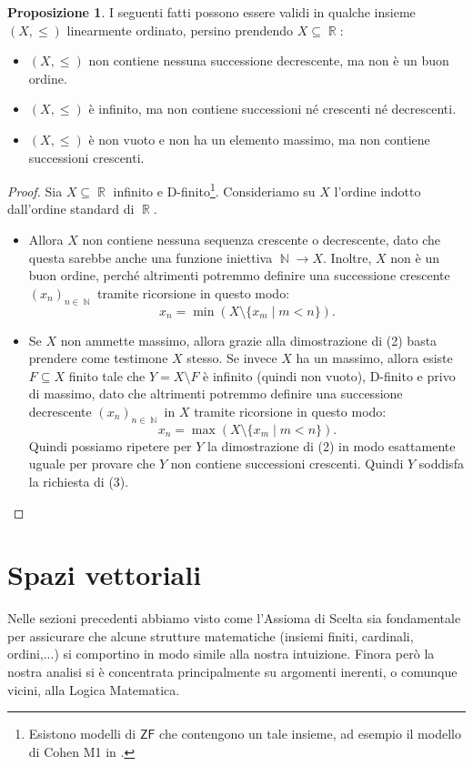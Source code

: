 \documentclass[12pt,a4paper]{report}
\theoremstyle{definition}
\newtheorem{prop}[teo]{Proposizione}  %
\theoremstyle{num.custom-title}
\DeclareMathOperator{\N}{\mathbb{N}}
\DeclareMathOperator{\R}{\mathbb{R}}
\DeclareMathOperator{\sm}{\setminus}
\newcommand{\ZF}{\ensuremath{\mathsf{ZF}}\xspace}
\begin{document}
\begin{prop}
I seguenti fatti possono essere validi in qualche insieme $(X, \leq)$ linearmente ordinato, persino prendendo $X \subseteq \R$:
\begin{itemize}
\item[(1)] $(X, \leq)$ non contiene nessuna successione decrescente, ma non è un buon ordine.
\item[(2)] $(X, \leq)$ è infinito, ma non contiene successioni né crescenti né decrescenti.
\item[(3)] $(X, \leq)$ è non vuoto e non ha un elemento massimo, ma non contiene successioni crescenti.
\end{itemize}
\begin{proof} Sia $X \subseteq \R$ infinito e D-finito\footnote{Esistono modelli di \ZF che contengono un tale insieme, ad esempio il modello di Cohen M1 in \cite{HoRu98:Herrlich}.}. Consideriamo su $X$ l'ordine indotto dall'ordine standard di $\R$.
\begin{itemize}
\item[(1) e (2)] Allora $X$ non contiene nessuna sequenza crescente o decrescente, dato che questa sarebbe anche una funzione iniettiva $\N \to X$. Inoltre, $X$ non è un buon ordine, perché altrimenti potremmo definire una successione crescente $(x_n)_{n \in \N}$ tramite ricorsione in questo modo:
\[
x_n = \min (X \sm \{x_m \mid m<n\}).
\]
\item[(3)] Se $X$ non ammette massimo, allora grazie alla dimostrazione di (2) basta prendere come testimone $X$ stesso. Se invece $X$ ha un massimo, allora esiste $F \subseteq X$ finito tale che $Y=X \sm F$ è infinito (quindi non vuoto), D-finito e privo di massimo, dato che altrimenti potremmo definire una successione decrescente $(x_n)_{n \in \N}$ in $X$ tramite ricorsione in questo modo:
\[
x_n = \max (X \sm \{x_m \mid m<n\}).
\]
Quindi possiamo ripetere per $Y$ la dimostrazione di (2) in modo esattamente uguale per provare che $Y$ non contiene successioni crescenti. Quindi $Y$ soddisfa la richiesta di (3).
\end{itemize}
\end{proof}
\end{prop}


\section{Spazi vettoriali}

Nelle sezioni precedenti abbiamo visto come l'Assioma di Scelta sia fondamentale per assicurare che alcune strutture matematiche (insiemi finiti, cardinali, ordini,...) si comportino in modo simile alla nostra intuizione. Finora però la nostra analisi si è concentrata principalmente su argomenti inerenti, o comunque vicini, alla Logica Matematica.
\end{document}
